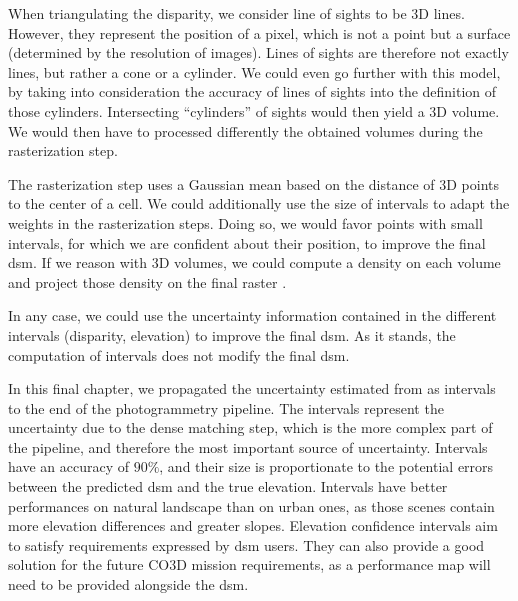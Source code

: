 When triangulating the disparity, we consider line of sights to be 3D lines. However, they represent the position of a pixel, which is not a point but a surface (determined by the resolution of images). Lines of sights are therefore not exactly lines, but rather a cone or a cylinder.  We could even go further with this model, by taking into consideration the accuracy of lines of sights into the definition of those cylinders. Intersecting ``cylinders'' of sights would then yield a 3D volume. We would then have to processed differently the obtained volumes during the rasterization step. 

The rasterization step uses a Gaussian mean based on the distance of 3D points to the center of a cell. We could additionally use the size of intervals to adapt the weights in the rasterization steps. Doing so, we would favor points with small intervals, \ie for which we are confident about their position, to improve the final \acrshort{dsm}. If we reason with 3D volumes, we could compute a density on each volume and project those density on the final raster \etc. 

In any case, we could use the uncertainty information contained in the different intervals (disparity, elevation) to improve the final \acrshort{dsm}. As it stands, the computation of intervals does not modify the final \acrshort{dsm}.

In this final chapter, we propagated the uncertainty estimated from  as intervals to the end of the photogrammetry pipeline. The intervals represent the uncertainty due to the dense matching step, which is the more complex part of the pipeline, and therefore the most important source of uncertainty. Intervals have an accuracy of $90\%$, and their size is proportionate to the potential errors between the predicted \acrshort{dsm} and the true elevation. Intervals have better performances on natural landscape than on urban ones, as those scenes contain more elevation differences and greater slopes. Elevation confidence intervals aim to satisfy requirements expressed by \acrshort{dsm} users. They can also provide a good solution for the future CO3D mission requirements, as a performance map will need to be provided alongside the \acrshort{dsm}.

\pagebreak
\blankpage